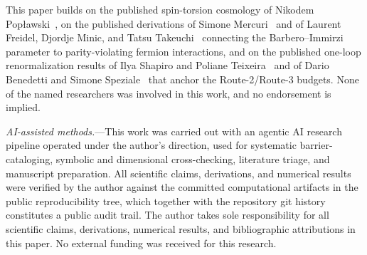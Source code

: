 \documentclass[aps,prd,twocolumn,superscriptaddress,preprintnumbers,nofootinbib,longbibliography,floatfix]{revtex4-2}
\begin{document}
\begin{acknowledgments}
This paper builds on the published spin-torsion cosmology of Nikodem
Pop\l{}awski~\cite{Poplawski2010,Poplawski2011,Poplawski2012,Poplawski2016},
on the published derivations of Simone Mercuri~\cite{Mercuri2009} and of
Laurent Freidel, Djordje Minic, and Tatsu Takeuchi~\cite{Freidel2005}
connecting the Barbero--Immirzi parameter to parity-violating fermion
interactions, and on the published one-loop renormalization results of
Ilya Shapiro and Poliane Teixeira~\cite{ShapiroTeixeira2014} and of Dario
Benedetti and Simone Speziale~\cite{BenedettiSpeziale2011run} that anchor
the Route-2/Route-3 budgets. None of the named researchers was involved
in this work, and no endorsement is implied.

\emph{AI-assisted methods.}---This work was carried out with an agentic
AI research pipeline operated under the author's direction, used for
systematic barrier-cataloging, symbolic and dimensional cross-checking,
literature triage, and manuscript preparation. All scientific claims,
derivations, and numerical results were verified by the author against
the committed computational artifacts in the public reproducibility
tree, which together with the repository git history constitutes a
public audit trail. The author takes sole responsibility for all
scientific claims, derivations, numerical results, and bibliographic
attributions in this paper. No external funding was received for this
research.
\end{acknowledgments}



\end{document}

